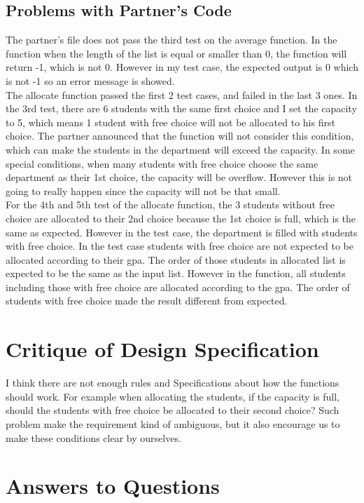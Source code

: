 \documentclass[12pt]{article}
\begin{document}
\subsection{Problems with Partner's Code}
The partner's file does not pass the third test on the average function. In the function when the length of the list is equal or smaller than 0, the function will return -1, which is not 0. However in my test case, the expected output is 0 which is not -1 so an error message is showed.\\
The allocate function passed the first 2 test cases, and failed in the last 3 ones. In the 3rd test, there are 6 students with the same first choice and I set the capacity to 5, which means 1 student with free choice will not be allocated to his first choice. The partner announced that the function will not consider this condition, which can make the students in the department will exceed the capacity. In some special conditions, when many students with free choice choose the same department as their 1st choice, the capacity will be overflow. However this is not going to really happen since the capacity will not be that small.\\
For the 4th and 5th test of the allocate function, the 3 students without free choice are allocated to their 2nd choice because the 1st choice is full, which is the same as expected. However in the test case, the department is filled with students with free choice. In the test case students with free choice are not expected to be allocated according to their gpa. The order of those students in allocated list is expected to be the same as the input list. However in the function, all students including those with free choice are allocated according to the gpa. The order of students with free choice made the result different from expected.
\section{Critique of Design Specification}
I think there are not enough rules and Specifications about how the functions should work. For example when allocating the students, if the capacity is full, should the students with free choice be allocated to their second choice? Such problem make the requirement kind of ambiguous, but it also encourage us to make these conditions clear by ourselves.

\section{Answers to Questions}
\end{document}
